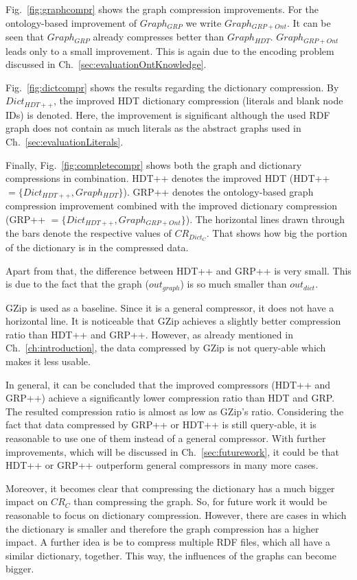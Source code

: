 \FloatBarrier
Fig.~\ref{fig:graphcompr} shows the graph compression improvements. For the ontology-based improvement of $Graph_{GRP}$ we write $Graph_{GRP+Ont}$.  It can be seen that $Graph_{GRP}$ already compresses better than $Graph_{HDT}$. $Graph_{GRP+Ont}$ leads only to a small improvement. This is again due to the encoding problem discussed in Ch.~\ref{sec:evaluationOntKnowledge}.

Fig.~\ref{fig:dictcompr} shows the results regarding the dictionary compression. By $Dict_{HDT++}$, the improved HDT dictionary compression (literals and blank node IDs) is denoted. Here, the improvement is significant although the used RDF graph does not contain as much literals as the abstract graphs used in Ch.~\ref{sec:evaluationLiterals}. 

Finally, Fig.~\ref{fig:completecompr} shows both the graph and dictionary compressions in combination. HDT++ denotes the improved HDT (HDT++$=\{  Dict_{HDT++}, Graph_{HDT} \} $). GRP++ denotes the ontology-based graph compression improvement combined with the improved dictionary compression (GRP++ $=\{ Dict_{HDT++}, Graph_{GRP+Ont} \}$). The horizontal lines drawn through the bars denote the respective values of $CR_{Dict_C}$. That shows how big the portion of the dictionary is in the compressed data. 

Apart from that, the difference between HDT++ and GRP++ is very small. This is due to the fact that the graph ($out_{graph}$) is so much smaller than $out_{dict}$.

GZip is used as a baseline. Since it is a general compressor, it does not have a horizontal line. It is noticeable that GZip achieves a slightly better compression ratio than HDT++ and GRP++. However, as already mentioned in Ch.~\ref{ch:introduction}, the data compressed by GZip is not query-able which makes it less usable.

In general, it can be concluded that the improved compressors (HDT++ and GRP++) achieve a significantly lower compression ratio than HDT and GRP. The resulted compression ratio is almost as low as GZip's ratio. Considering the fact that data compressed by GRP++ or HDT++ is still query-able, it is reasonable to use one of them instead of a general compressor. With further improvements, which will be discussed in Ch.~\ref{sec:futurework}, it could be that HDT++ or GRP++ outperform general compressors in many more cases.

Moreover, it becomes clear that compressing the dictionary has a much bigger impact on $CR_C$ than compressing the graph. So, for future work it would be reasonable to focus on dictionary compression. However, there are cases in which the dictionary is smaller and therefore the graph compression has a higher impact. A further idea is be to compress multiple RDF files, which all have a similar dictionary, together. This way, the influences of the graphs can become bigger.



